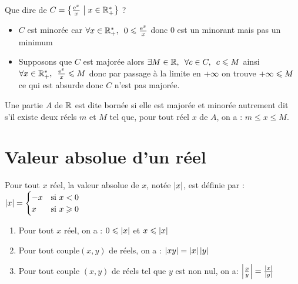 \begin{exoex}
        ~\\
	Que dire de \(C = \left\lbrace\frac{\mathrm{e}^{x}}{x} \;\middle|\; x \in \mathbb{R}_+^*\right\rbrace\) ?
\end{exoex}

\begin{corr}
	\begin{itemize}

		\item \(C\) est minorée car \( \quantifs{\forall x \in \Rps} 0 \leq \frac{\e{x}}{x} \) donc \(0\) est un minorant mais pas un minimum  \\
		\item Supposons que \(C\) est majorée alors \(\quantifs{\exists M \in \R;\forall c \in C} c\leq M \) ainsi \(\quantifs{\forall x \in \Rps} \frac{\e{x}}{x} \leq M \) donc par passage à la limite en \(+\infty\) on trouve \(+\infty \leqslant M\) ce qui est absurde donc \(C\) n'est pas majorée.
	\end{itemize}
\end{corr}

\begin{defi}
	Une partie \(A\) de \(\mathbb{R}\) est dite bornée si elle est majorée et minorée autrement dit s’il existe deux réels \(m\) et \(M\) tel que, pour tout réel \(x\) de \(A\), on a : \(m\leq x \leq M\).
\end{defi}

\section{Valeur absolue d'un réel}
\begin{defi}
	Pour tout \(x\) réel, la valeur absolue de \(x\), notée \(\left\lvert x\right\rvert\), est définie par : \(\left\lvert x\right\rvert = \begin{cases}
		-x & \text{si }  x < 0   \\
		x  & \text{si }  x\geqslant 0 \\
	\end{cases}\)
\end{defi}

\begin{prop}
	\begin{enumerate}
		\item Pour tout \(x\) réel, on a : \(0\leqslant\left\lvert x\right\rvert\) et \(x\leqslant\left\lvert x\right\rvert\)
		\item Pour tout couple\((x,y)\) de réels, on a : \(\left\lvert xy\right\rvert = \left\lvert x\right\rvert\left\lvert y\right\rvert\)
		\item Pour tout couple \((x,y)\) de réels tel que \(y\) est non nul, on a: \(\left\lvert\frac{x}{y}\right\rvert = \frac{\left\lvert x\right\rvert}{\left\lvert y\right\rvert}\)
	\end{enumerate}
\end{prop}

